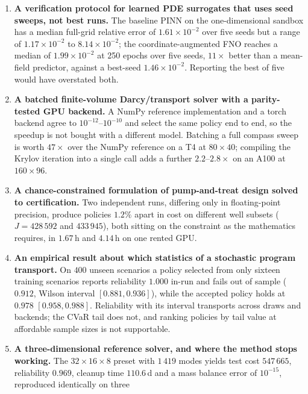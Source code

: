 \documentclass[11pt]{article}
\begin{document}
\begin{enumerate}
  \item \textbf{A verification protocol for learned PDE surrogates that uses seed
        sweeps, not best runs.} The baseline PINN on the one-dimensional sandbox
        has a median full-grid relative error of $1.61\times10^{-2}$ over five
        seeds but a range of $1.17\times10^{-2}$ to $8.14\times10^{-2}$; the
        coordinate-augmented FNO reaches a median of $1.99\times10^{-2}$ at 250
        epochs over five seeds, $11\times$ better than a mean-field predictor,
        against a best-seed $1.46\times10^{-2}$. Reporting the best of five
        would have overstated both.
  \item \textbf{A batched finite-volume Darcy/transport solver with a parity-tested
        GPU backend.} A NumPy reference implementation and a torch backend agree
        to $10^{-12}$--$10^{-10}$ and select the same policy end to end, so the
        speedup is not bought with a different model. Batching a full compass
        sweep is worth $47\times$ over the NumPy reference on a T4 at
        $80\times40$; compiling the Krylov iteration into a single call adds a
        further $2.2$--$2.8\times$ on an A100 at $160\times96$.
  \item \textbf{A chance-constrained formulation of pump-and-treat design solved
        to certification.} Two independent runs, differing only in floating-point
        precision, produce policies $1.2\%$ apart in cost on different well
        subsets ($J = 428\,592$ and $433\,945$), both sitting on the constraint
        as the mathematics requires, in $1.67$\,h and $4.14$\,h on one rented GPU.
  \item \textbf{An empirical result about which statistics of a stochastic
        program transport.} On $400$ unseen scenarios a policy selected from only
        sixteen training scenarios reports reliability $1.000$ in-run and fails
        out of sample ($0.912$, Wilson interval $[0.881,0.936]$), while the
        accepted policy holds at $0.978$ $[0.958,0.988]$. Reliability with its
        interval transports across draws and backends; the CVaR tail does not,
        and ranking policies by tail value at affordable sample sizes is not
        supportable.
  \item \textbf{A three-dimensional reference solver, and where the method
        stops working.} The $32\times16\times8$ preset with $1\,419$ modes yields
        test cost $547\,665$, reliability $0.969$, cleanup time $110.6$\,d and a
        mass balance error of $10^{-15}$, reproduced identically on three

\end{enumerate}
\end{document}
